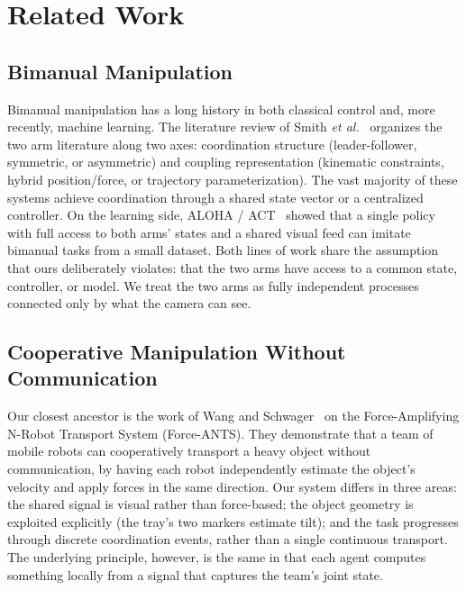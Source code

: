 \section{Related Work}
\label{sec:related}

\subsection{Bimanual Manipulation}
Bimanual manipulation has a long history in both classical control and, more recently, machine learning. The literature review of Smith \emph{et al.}~\cite{smith2012dualarm} organizes the two arm literature along two axes: coordination structure (leader-follower, symmetric, or asymmetric) and coupling representation (kinematic constraints, hybrid position/force, or trajectory parameterization). The vast majority of these systems achieve coordination through a shared state vector or a centralized controller. On the learning side, ALOHA / ACT~\cite{zhao2023aloha} showed that a single policy with full access to both arms' states and a shared visual feed can imitate bimanual tasks from a small dataset. Both lines of work share the assumption that ours deliberately violates: that the two arms have access to a common state, controller, or model. We treat the two arms as fully independent processes connected only by what the camera can see.

\subsection{Cooperative Manipulation Without Communication}
Our closest ancestor is the work of Wang and Schwager~\cite{wang2016forceants} on the Force-Amplifying N-Robot Transport System (Force-ANTS). They demonstrate that a team of mobile robots can cooperatively transport a heavy object without communication, by having each robot independently estimate the object's velocity and apply forces in the same direction. Our system differs in three areas: the shared signal is visual rather than force-based; the object geometry is exploited explicitly (the tray's two markers estimate tilt); and the task progresses through discrete coordination events, rather than a single continuous transport. The underlying principle, however, is the same in that each agent computes something locally from a signal that captures the team's joint state.


